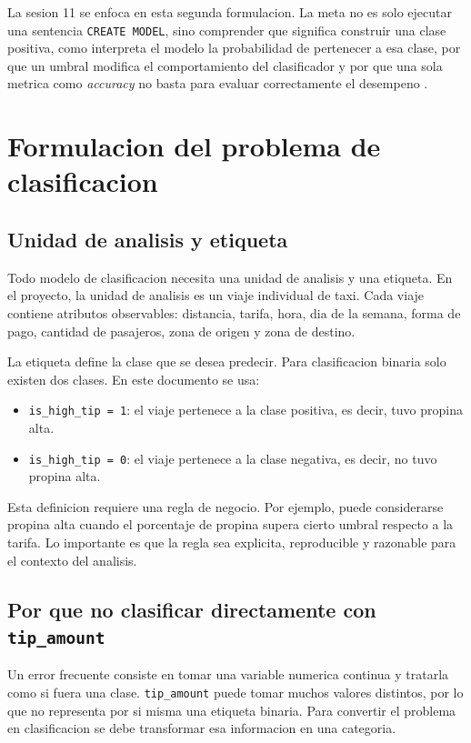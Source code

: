 \documentclass[12pt]{article}
\begin{document}
La sesion 11 se enfoca en esta segunda formulacion. La meta no es solo ejecutar una sentencia \texttt{CREATE MODEL}, sino comprender que significa construir una clase positiva, como interpreta el modelo la probabilidad de pertenecer a esa clase, por que un umbral modifica el comportamiento del clasificador y por que una sola metrica como \textit{accuracy} no basta para evaluar correctamente el desempeno \cite{google_class_metrics,google_thresholding}.

\section{Formulacion del problema de clasificacion}
\subsection{Unidad de analisis y etiqueta}
Todo modelo de clasificacion necesita una unidad de analisis y una etiqueta. En el proyecto, la unidad de analisis es un viaje individual de taxi. Cada viaje contiene atributos observables: distancia, tarifa, hora, dia de la semana, forma de pago, cantidad de pasajeros, zona de origen y zona de destino.

La etiqueta define la clase que se desea predecir. Para clasificacion binaria solo existen dos clases. En este documento se usa:
\begin{itemize}[leftmargin=*]
\item \texttt{is\_high\_tip = 1}: el viaje pertenece a la clase positiva, es decir, tuvo propina alta.
\item \texttt{is\_high\_tip = 0}: el viaje pertenece a la clase negativa, es decir, no tuvo propina alta.
\end{itemize}

Esta definicion requiere una regla de negocio. Por ejemplo, puede considerarse propina alta cuando el porcentaje de propina supera cierto umbral respecto a la tarifa. Lo importante es que la regla sea explicita, reproducible y razonable para el contexto del analisis.

\subsection{Por que no clasificar directamente con \texttt{tip\_amount}}
Un error frecuente consiste en tomar una variable numerica continua y tratarla como si fuera una clase. \texttt{tip\_amount} puede tomar muchos valores distintos, por lo que no representa por si misma una etiqueta binaria. Para convertir el problema en clasificacion se debe transformar esa informacion en una categoria.
\end{document}
